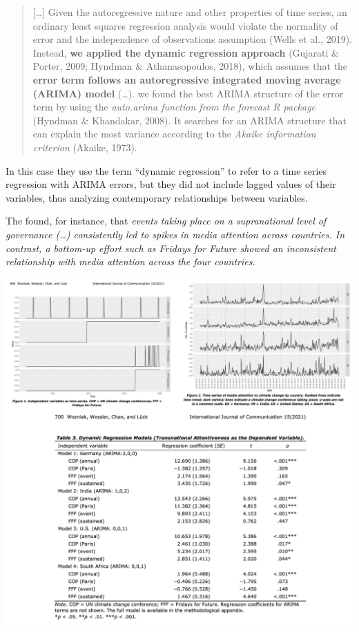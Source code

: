 \documentclass[
]{article}
\begin{document}
\begin{quote}
{[}\ldots{]} Given the autoregressive nature and other properties of time series, an ordinary least squares regression analysis would violate the normality of error and the independence of observations assumption (Wells et al., 2019). Instead, \textbf{we applied the dynamic regression approach} (Gujarati \& Porter, 2009; Hyndman \& Athanasopoulos, 2018), which assumes that the \textbf{error term follows an autoregressive integrated moving average (ARIMA) model} (\ldots). we found the best ARIMA structure of the error term by using the \emph{auto.arima function from the forecast R package} (Hyndman \& Khandakar, 2008). It searches for an ARIMA structure that can explain the most variance according to the \emph{Akaike information criterion} (Akaike, 1973).
\end{quote}

In this case they use the term ``dynamic regression'' to refer to a time series regression with ARIMA errors, but they did not include lagged values of their variables, thus analyzing contemporary relationships between variables.

The found, for instance, that \emph{events taking place on a supranational level of governance (\ldots) consistently led to spikes in media attention across countries. In contrast, a bottom-up effort such as Fridays for Future showed an inconsistent relationship with media attention across the four countries.}

\includegraphics[width=20.99in]{images/Event-Centered Nature of Global Public Spheres}
\end{document}
